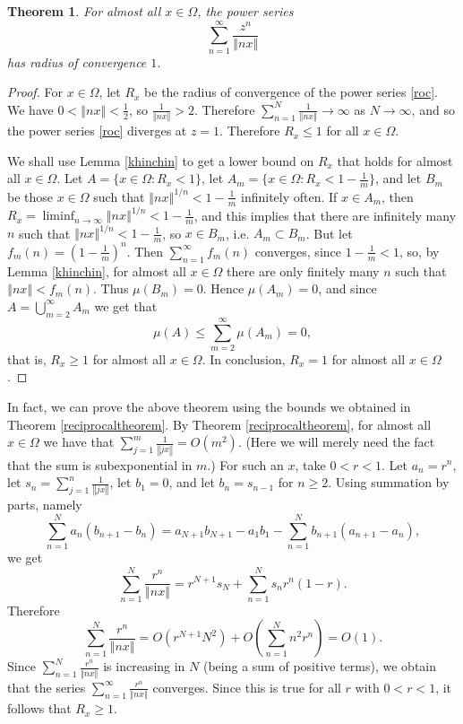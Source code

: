 \documentclass{amsart}
\newcommand{\norm}[1]{\left\Vert #1 \right\Vert}
\newtheorem{theorem}{Theorem}
\begin{document}
\begin{theorem}
For almost all $x \in \Omega$, the power series 
\begin{equation}
\sum_{n=1}^\infty \frac{z^n}{\norm{nx}}
\label{roc}
\end{equation}
has radius of convergence $1$.
\label{roclemma}
\end{theorem}
\begin{proof}
For $x \in \Omega$, let $R_x$ be the radius of convergence of the power series \eqref{roc}.
We have $0 < \norm{nx} < \frac{1}{2}$, so $\frac{1}{\norm{nx}} > 2$. Therefore $\sum_{n=1}^N \frac{1}{\norm{nx}} \to \infty$ as $N \to \infty$, and so
the power series \eqref{roc} diverges at $z=1$. Therefore $R_x \leq 1$ for all $x \in \Omega$.

We shall use Lemma \ref{khinchin} to get a lower bound on $R_x$ that holds for almost all $x \in \Omega$.
Let $A=\{x \in \Omega: R_x<1\}$,
let $A_m=\{x \in \Omega:R_x<1-\frac{1}{m}\}$, and let
$B_m$ be those $x \in \Omega$ such that $\norm{nx}^{1/n}<1-\frac{1}{m}$ infinitely often.
If $x \in A_m$, then $R_x=\liminf_{n \to \infty} \norm{nx}^{1/n}<1-\frac{1}{m}$, and this implies that there are infinitely many $n$ such that
$\norm{nx}^{1/n}<1-\frac{1}{m}$, so $x \in B_m$, i.e. 
$A_m \subset B_m$.
But let $f_m(n)=\left(1-\frac{1}{m}\right)^n$. Then $\sum_{n=1}^\infty f_m(n)$ converges, since $1-\frac{1}{m}<1$, so, by Lemma \ref{khinchin}, for almost all $x \in \Omega$ there are only
finitely many $n$ such that $\norm{nx} < f_m(n)$. Thus $\mu(B_m)=0$. Hence $\mu(A_m)=0$, and since $A=\bigcup_{m=2}^\infty A_m$ we
get that
\[
\mu(A) \leq \sum_{m=2}^\infty \mu(A_m)=0,
\]
that is, $R_x \geq 1$ for almost all $x \in \Omega$. In conclusion, $R_x=1$ for almost all $x \in \Omega$.
\end{proof}

In fact, we can prove the above theorem using the bounds we obtained in Theorem \ref{reciprocaltheorem}.
By Theorem \ref{reciprocaltheorem}, for almost all $x \in \Omega$ we have that $\sum_{j=1}^m \frac{1}{\norm{j x}}=O(m^2)$. (Here we will merely need the fact that the sum is 
subexponential in $m$.) For such an $x$, take $0<r<1$.
Let $a_n=r^n$, let $s_n=\sum_{j=1}^n \frac{1}{\norm{j x}}$, let $b_1=0$, and let $b_n=s_{n-1}$ for $n  \geq 2$. Using summation by parts,
namely
\[
\sum_{n=1}^N a_n(b_{n+1}-b_n)=a_{N+1}b_{N+1}-a_1 b_1 - \sum_{n=1}^N b_{n+1}(a_{n+1}-a_n),
\]
we get
\[
\sum_{n=1}^N \frac{r^n}{\norm{nx}} = r^{N+1} s_N + \sum_{n=1}^N s_n  r^n (1-r).
\]
Therefore
\[
\sum_{n=1}^N \frac{r^n}{\norm{nx}}  = O\left(r^{N+1} N^2\right) + O\left( \sum_{n=1}^N n^2 r^n \right)=O(1).
\]
Since $\sum_{n=1}^N \frac{r^n}{\norm{nx}}$ is increasing in $N$ (being a sum of positive terms), we obtain that the series
$\sum_{n=1}^\infty \frac{r^n}{\norm{nx}}$ converges. Since this is true for all $r$ with $0<r<1$, it follows that $R_x \geq 1$.
\end{document}
